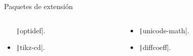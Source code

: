 \begin{frame}
\begin{block}{Paquetes de extensión}
\begin{columns}
\begin{column}{.2\paperwidth}
\begin{itemize}
					      \texttt|optidef|.

					\item

					      \texttt|tikz-cd|.
				\end{itemize}
			\end{column}
			\begin{column}{.2\paperwidth}
				\begin{itemize}
					\item

					      \texttt|unicode-math|.

					\item

					      \texttt|diffcoeff|.
				\end{itemize}
			\end{column}
		\end{columns}
	\end{block}
\end{frame}

